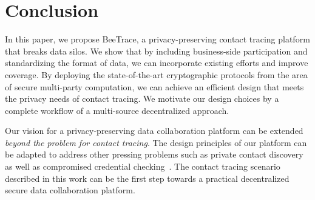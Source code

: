 \documentclass[11pt,dvipdfmx]{article}  %
\newcommand{\sysname}{\textsf{BeeTrace}\xspace}
\begin{document}

\section{Conclusion}

In this paper, we propose \sysname, a privacy-preserving contact tracing platform that breaks data silos. We show that by including business-side participation and standardizing the format of data, we can incorporate existing efforts and improve coverage. By deploying the state-of-the-art cryptographic protocols from the area of secure multi-party computation, we can achieve an efficient design that meets the privacy needs of contact tracing. We motivate our design choices by a complete workflow of a multi-source decentralized approach. %

Our vision for a privacy-preserving data collaboration platform can be extended \emph{beyond the problem for contact tracing}. 
The design principles of our platform can be adapted to address other pressing problems such as private contact discovery~\cite{Kales2019} as well as compromised credential checking~\cite{Li2019}. 
The contact tracing scenario described in this work can be the first step towards a practical decentralized secure data collaboration platform. 
\end{document}
